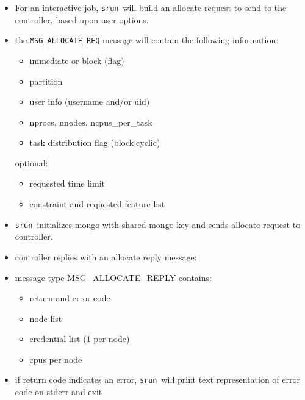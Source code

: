 \documentclass[article,letter,landscape]{seminar}
\newcommand{\srun}{{\tt srun}}
\begin{document}
\begin{slide}
  \begin{center}
  \begin{itemize}
  \item For an interactive job, \srun\ will build an allocate request
        to send to the controller, based upon user options. 
  \item the {\tt MSG\_ALLOCATE\_REQ} message will contain the 
        following information:
  \begin{itemize}
    \item immediate or block (flag)
    \item partition
    \item user info (username and/or uid)
    \item nprocs, nnodes, ncpus\_per\_task
    \item task distribution flag (block$|$cyclic)
  \end{itemize}
    optional:
  \begin{itemize}
    \item requested time limit 
    \item constraint and requested feature list
  \end{itemize}
  \end{itemize}
  \end{center}
\end{slide}

\begin{slide}
  \begin{center}
  \begin{itemize}
  \item \srun\ initializes mongo with shared mongo-key and
        sends allocate request to controller.
  \item controller replies with an allocate reply message:
  \item message type MSG\_ALLOCATE\_REPLY contains:
  \begin{itemize}
    \item return and error code
    \item node list
    \item credential list (1 per node)
    \item cpus per node 
  \end{itemize}
  \item if return code indicates an error, \srun\ will print
        text representation of error code on stderr and exit
  \end{itemize}
  \end{center}
\end{slide}
\end{document}
